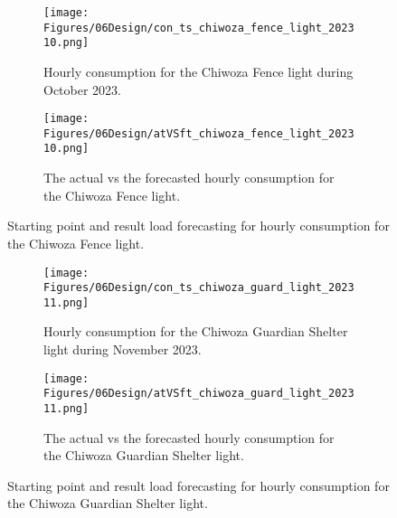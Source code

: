 \begin{figure}
    \begin{subfigure}{\textwidth}
    \centering
    \texttt{[image: Figures/06Design/con\_ts\_chiwoza\_fence\_light\_202310.png]}
    \caption{Hourly consumption for the Chiwoza Fence light during October 2023.}
    \label{fig:con_ts_chiwoza_fence_light_202310}
  \end{subfigure}

  \vspace{0.5cm}

  \begin{subfigure}{\textwidth}
    \centering
    \texttt{[image: Figures/06Design/atVSft\_chiwoza\_fence\_light\_202310.png]}
    \caption{The actual vs the forecasted hourly consumption for the Chiwoza Fence light.}
    \label{fig:atVSft_chiwoza_fence_light_202310}
  \end{subfigure}

  \caption[Fence Light consumption forecasting]{Starting point and result load forecasting for hourly consumption for the Chiwoza Fence light.}
  \label{fig:forecasting_results_chiwoza_fence_light}
\end{figure}

\begin{figure}
    \begin{subfigure}{\textwidth}
    \centering
    \texttt{[image: Figures/06Design/con\_ts\_chiwoza\_guard\_light\_202311.png]}
    \caption{Hourly consumption for the Chiwoza Guardian Shelter light during November 2023.}
    \label{fig:con_ts_chiwoza_guard_light_202311}
  \end{subfigure}

  \vspace{0.5cm}

  \begin{subfigure}{\textwidth}
    \centering
    \texttt{[image: Figures/06Design/atVSft\_chiwoza\_guard\_light\_202311.png]}
    \caption{The actual vs the forecasted hourly consumption for the Chiwoza Guardian Shelter light.}
    \label{fig:atVSft_chiwoza_guard_light_202311}
  \end{subfigure}

  \caption[Guardian Shelter consumption forecasting]{Starting point and result load forecasting for hourly consumption for the Chiwoza Guardian Shelter light.}
  \label{fig:forecasting_results_chiwoza_guard_light}
\end{figure}

